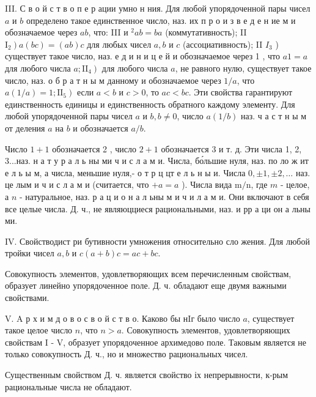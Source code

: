 \documentclass[10pt]{article}
\begin{document}
III. С в о й с т в о п е р ации умно н ния. Для любой упорядоченной пары чисел $a$ и $b$ определено такое единственное число, наз. их п р о и з в е д е н ие м и обозначаемое через $a b$, что: III и $^{2} a b=b a$ (коммутативность); II $\left.\mathrm{I}_{2}\right) a(b c)=(a b) c$ для любых чисел $a, b$ и $c$ (ассоциативность); II $I_{3}$ ) существует такое число, наз. е д и н и ц е й и обозначаемое через 1 , что $a 1=a$ для любого числа $\left.a ; \mathrm{II}_{4}\right)$ для любого числа $a$, не равного нулю, существует такое число, наз. о б р а т н ы м данному и обозначаемое через $1 / a$, что $\left.a(1 / a)=1 ; \mathrm{II}_{5}\right)$ если $a<b$ и $c>0$, то $a c<b c$. Эти свойства гарантируют единственность единицы и единственность обратного каждому элементу. Для любой упорядоченной пары чисел $a$ и $b, b \neq 0$, число $a(1 / b)$ наз. ч а с т н ы м от деления $a$ на $b$ и обозначается $a / b$.



Число $1+1$ обозначается 2 , число $2+1$ обозначается 3 и т. д. Эти числа 1, 2, 3...наз. н а т у р а л ь ны ми ч и с л а м и. Числа, бо́льшие нуля, наз. по ло ж ит е л ь ы м, а числа, меньшие нуля,- о т р ц цт е л ь н ы и. Числа $0, \pm 1, \pm 2, \ldots$ наз. це лым и ч и с л а м и (считается, что $+a=a$ ). Числа вида $\mathrm{m} / \mathrm{n}$, где $m$ - целое, а $n$ - натуральное, наз. р а ц и о н а л ьны м и ч и л а м и. Они включают в себя все целые числа. Д. ч., не являюцциеся рациональными, наз. и рр а ци он а льны ми.



IV. Свойстводист ри бутивности умножения относительно сло жения. Для любой тройки чисел $a, b$ и $c(a+b) c=a c+b c$.



Совокупность элементов, удовлетворяющих всем перечисленным свойствам, образует линейно упорядоченное поле. Д. ч. обладают еще двумя важными свойствами.



V. A р х и м д о в о с в о й с т в о. Каково бы нIг было число $a$, существует такое целое число $n$, что $n>a$. Совокупность элементов, удовлетворяющих свойствам I - V, образует упорядоченное архимедово поле. Таковым является не только совокупность Д. ч., но и множество рациональных чисел.



Существенным свойством Д. ч. является свойство іх непрерывности, к-рым рациональные числа не обладают.
\end{document}
